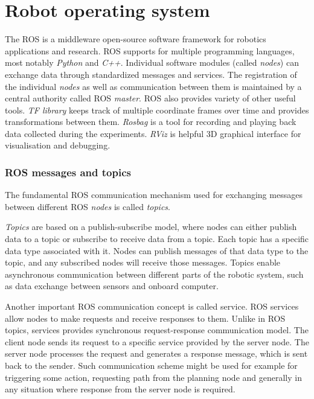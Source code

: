 \section{Robot operating system}
The \ac{ROS} \cite{ROS} is a middleware open-source software framework for robotics applications and research.
\ac{ROS} supports for multiple programming languages, most notably \textit{Python} and \textit{C++}.
Individual software modules (called \textit{nodes}) can exchange data through standardized messages and services.
The registration of the individual \textit{nodes} as well as communication between them is maintained by a central authority called \ac{ROS} \textit{master}.
\ac{ROS} also provides variety of other useful tools.
\textit{TF library} keeps track of multiple coordinate frames over time and provides transformations between them.
\textit{Rosbag} is a tool for recording and playing back data collected during the experiments.
\textit{RViz} is helpful 3D graphical interface for visualisation and debugging.


\subsubsection{ROS messages and topics}
The fundamental \ac{ROS} communication mechanism used for exchanging messages between different \ac{ROS} \textit{nodes} is called \textit{topics}.

\textit{Topics} are based on a publish-subscribe model, where nodes can either publish data to a topic or subscribe to receive data from a topic. 
Each topic has a specific data type associated with it.
Nodes can publish messages of that data type to the topic, and any subscribed nodes will receive those messages.
Topics enable asynchronous communication between different parts of the robotic system, such as data exchange between sensors and onboard computer.

Another important \ac{ROS} communication concept is called service.
\ac{ROS} services allow nodes to make requests and receive responses to them.
Unlike in \ac{ROS} topics, services provides synchronous request-response communication model.
The client node sends its request to a specific service provided by the server node.
The server node processes the request and generates a response message, which is sent back to the sender.
Such communication scheme might be used for example for triggering some action, requesting path from the planning node and generally in any situation where response from the server node is required.

